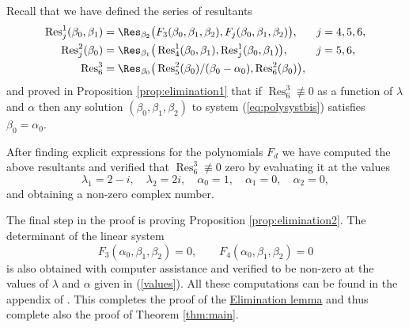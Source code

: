 Recall that we have defined the series of resultants
\begin{align*}
 \operatorname{Res}^1_j(\beta_0,\beta_1) &= \Res_{\beta_2}\big(F_3(\beta_0,\beta_1,\beta_2),F_j(\beta_0,\beta_1,\beta_2)\big), & j &= 4,5,6, \\
 \operatorname{Res}^2_j(\beta_0) &= \Res_{\beta_1}\big(\operatorname{Res}^1_4(\beta_0,\beta_1),\operatorname{Res}^1_j(\beta_0,\beta_1)\big), & j &= 5,6, \\
 \operatorname{Res}^3_6   &= \Res_{\beta_0}\big(\operatorname{Res}^2_5(\beta_0)/(\beta_0-\alpha_0),\operatorname{Res}^2_6(\beta_0)\big), & &
\end{align*}
and proved in Proposition \ref{prop:elimination1} that if $\operatorname{Res}_6^3\not\equiv0$ as a function of $\lambda$ and $\alpha$ then any solution $(\beta_0,\beta_1,\beta_2)$ to system (\ref{eq:polysystbis}) satisfies $\beta_0=\alpha_0$. 

After finding explicit expressions for the polynomials $F_d$ we have computed the above resultants and verified that $\operatorname{Res}_6^3\not\equiv0$ zero by evaluating it at the values
\begin{equation}\label{values}
  \lambda_1=2-i,\quad \lambda_2=2i,\quad \alpha_0=1,\quad \alpha_1=0,\quad \alpha_2=0,
\end{equation}
and obtaining a non-zero complex number.

The final step in the proof is proving Proposition \ref{prop:elimination2}. The determinant of the linear system 
\[ F_3(\alpha_0,\beta_1,\beta_2)=0,\qquad F_4(\alpha_0,\beta_1,\beta_2)=0 \] 
is also obtained with computer assistance and verified to be non-zero at the values of $\lambda$ and $\alpha$ given in (\ref{values}). All these computations can be found in the appendix of \cite{arXivVersion}. This completes the proof of the \hyperref[lemma:elimination]{Elimination lemma} and thus complete also the proof of Theorem \ref{thm:main}.




































